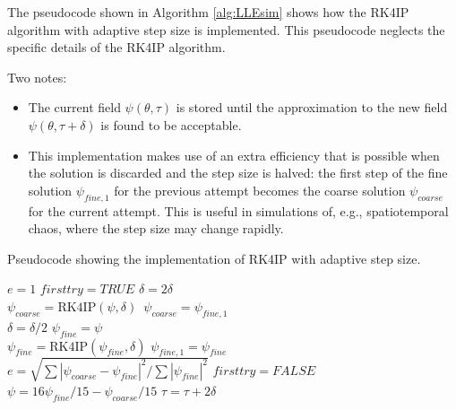 The pseudocode shown in Algorithm \ref{alg:LLEsim} shows how the RK4IP algorithm with adaptive step size is implemented. This pseudocode neglects the specific details of the RK4IP algorithm. 

Two notes:
\begin{itemize}
	\item The current field $\psi(\theta,\tau)$ is stored until the approximation to the new field $\psi(\theta,\tau+\delta)$ is found to be acceptable. 
	\item This implementation makes use of an extra efficiency that is possible when the solution is discarded and the step size is halved: the first step of the fine solution $\psi_{fine,1}$ for the previous attempt becomes the coarse solution $\psi_{coarse}$ for the current attempt. This is useful in simulations of, e.g., spatiotemporal chaos, where the step size may change rapidly.
\end{itemize}

{\selectfont 

\begin{algorithm}[h!]\caption{Pseudocode showing the implementation of RK4IP with adaptive step size.} \label{alg:LLEsim}
	\footnotesize{
	\begin{algorithmic}
		

		
		
		
		\Procedure{}{}
		
		\State $e=1$ 
		\State $firsttry=TRUE$ 
		\State $\delta=2\delta$ \\
		
		 \State $\psi_{coarse}=\mathrm{RK4IP}(\psi,\delta)$
		\Else \State $\,\psi_{coarse}=\psi_{fine,1}$ 
		\EndIf\\
		\State$\delta=\delta/2$
		\State$\psi_{fine}=\psi$\\
		\State $\psi_{fine}=\mathrm{RK4IP}(\psi_{fine},\delta)$
		\State $\psi_{fine,1}=\psi_{fine}$
		\EndIf
		\EndFor\\
		\State $e=\sqrt{\sum{|\psi_{coarse}-\psi_{fine}|^2}/\sum{|\psi_{fine}|^2}}$
		\State $firsttry=FALSE$
		\EndWhile\\
		
		
		\State $\psi=16\psi_{fine}/15-\psi_{coarse}/15$
		\State $\tau=\tau+2\delta$  \\
		 
		\EndIf
		 
		\EndIf
		\EndWhile
	\EndProcedure
	\end{algorithmic}
}
\end{algorithm}
}

